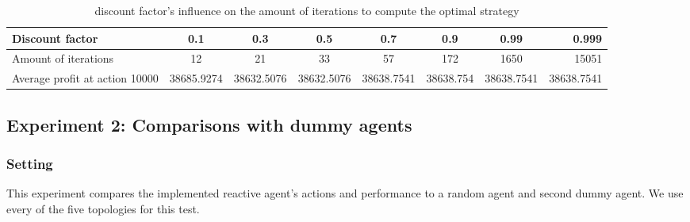 \documentclass[11pt]{article}
\begin{document}
\begin{table*}

\centering

\begin{tabular}{l*{6}{c}r}

Discount factor             & 0.1 & 0.3 & 0.5 & 0.7  & 0.9 & 0.99& 0.999 \\

\hline

Amount of iterations        &12	& 21 & 33 &	57 &172& 1650&15051 \\

Average profit at action 10000        &38685.9274&38632.5076&38632.5076&38638.7541&38638.754&38638.7541&38638.7541\\


\end{tabular}




\caption{discount factor's influence on the amount of iterations to compute the optimal strategy }

\label{table} 

\end{table*}




\subsection{Experiment 2: Comparisons with dummy agents}



\subsubsection{Setting}
This experiment compares the implemented reactive agent's actions and performance to a random agent and second dummy agent.
We use every of the five topologies for this test.
\end{document}
